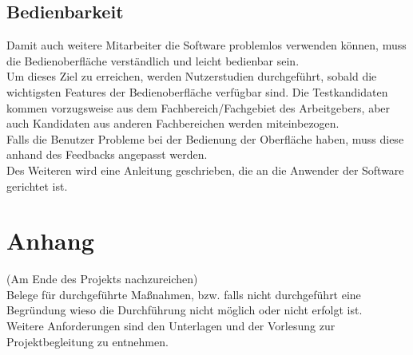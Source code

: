 \documentclass[accentcolor=tud9c,12pt,paper=a4]{tudreport}
\begin{document}
		\section{Bedienbarkeit}
		Damit auch weitere Mitarbeiter die Software problemlos verwenden können, muss die 
		Bedienoberfläche verständlich und leicht bedienbar sein.
		\\[5pt]
		Um dieses Ziel zu erreichen, werden Nutzerstudien durchgeführt, sobald die 
		wichtigsten Features der Bedienoberfläche verfügbar sind.
		Die Testkandidaten kommen vorzugsweise aus dem
		Fachbereich/Fachgebiet des Arbeitgebers, aber auch Kandidaten aus anderen
		Fachbereichen werden miteinbezogen.
		\\[5pt]
		Falls die Benutzer Probleme bei der Bedienung der Oberfläche haben, muss 
		diese anhand des Feedbacks angepasst werden.
		\\[5pt]
		Des Weiteren wird eine Anleitung geschrieben, die an die Anwender der Software
		gerichtet ist.

\appendix
	\chapter{Anhang}
		(Am Ende des Projekts nachzureichen)\\
		Belege für durchgeführte Maßnahmen, bzw. falls nicht durchgeführt eine Begründung 
		wieso die Durchführung nicht möglich oder nicht erfolgt ist. \\
		Weitere Anforderungen sind den Unterlagen und der Vorlesung zur Projektbegleitung 
		zu entnehmen.
\end{document}
